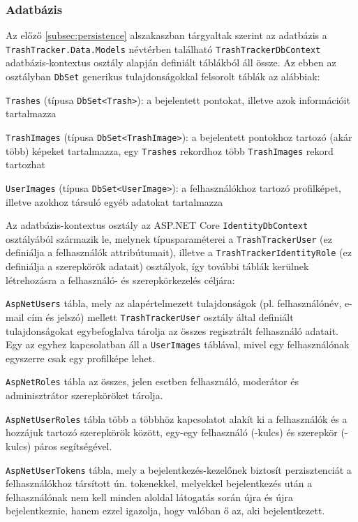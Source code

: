 \subsubsection{Adatbázis}

Az előző \ref{subsec:persistence} alszakaszban tárgyaltak szerint az adatbázis a \texttt{TrashTracker.Data.Models} névtérben található \texttt{TrashTrackerDbContext} adatbázis-kontextus osztály alapján definiált táblákból áll össze. Az ebben az osztályban \texttt{DbSet} generikus tulajdonságokkal felsorolt táblák az alábbiak:
\begin{compactitem}
	\item \texttt{Trashes} (típusa \texttt{DbSet<Trash>}): a bejelentett pontokat, illetve azok információit tartalmazza
	\item \texttt{TrashImages} (típusa \texttt{DbSet<TrashImage>}): a bejelentett pontokhoz tartozó (akár több) képeket tartalmazza, egy \texttt{Trashes} rekordhoz több \texttt{TrashImages} rekord tartozhat
	\item \texttt{UserImages} (típusa \texttt{DbSet<UserImage>}): a felhasználókhoz tartozó profilképet, illetve azokhoz társuló egyéb adatokat tartalmazza
\end{compactitem}
Az adatbázis-kontextus osztály az ASP.NET Core \texttt{IdentityDbContext} osztályából származik le, melynek típusparaméterei a \texttt{TrashTrackerUser} (ez definiálja a felhasználók attribútumait), illetve a \texttt{TrashTrackerIdentityRole} (ez definiálja a szerepkörök adatait) osztályok, így további táblák kerülnek létrehozásra a felhasználó- és szerepkörkezelés céljára:
\begin{compactitem}
	\item \texttt{AspNetUsers} tábla, mely az alapértelmezett tulajdonságok (pl. felhasználónév, e-mail cím és jelszó) mellett \texttt{TrashTrackerUser} osztály által definiált tulajdonságokat egybefoglalva tárolja az összes regisztrált felhasználó adatait. Egy az egyhez kapcsolatban áll a \texttt{UserImages} táblával, mivel egy felhasználónak egyszerre csak egy profilképe lehet.
	\item \texttt{AspNetRoles} tábla az összes, jelen esetben felhasználó, moderátor és adminisztrátor szerepköröket tárolja.
	\item \texttt{AspNetUserRoles} tábla több a többhöz kapcsolatot alakít ki a felhasználók és a hozzájuk tartozó szerepkörök között, egy-egy felhasználó (-kulcs) és szerepkör (-kulcs) páros segítségével.
	\item \texttt{AspNetUserTokens} tábla, mely a bejelentkezés-kezelőnek biztosít perzisztenciát a felhasználókhoz társított ún. tokenekkel, melyekkel bejelentkezés után a felhasználónak nem kell minden aloldal látogatás során újra és újra bejelentkeznie, hanem ezzel igazolja, hogy valóban ő az, aki bejelentkezett.
\end{compactitem}
